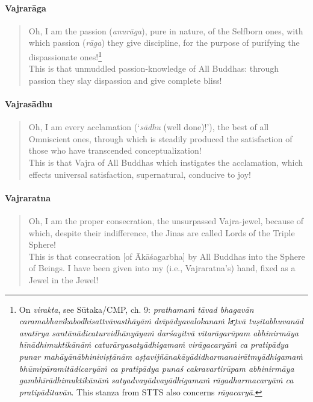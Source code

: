 \documentclass[11pt]{book}
\newcommand{\skt}[1]{\emph{#1}}
\begin{document}
\paragraph{Vajrarāga}

\begin{verse}
Oh, I am the passion (\emph{anurāga}), pure in nature, of the Selfborn ones, with which passion (\emph{rāga}) they give discipline, for the purpose of purifying the dispassionate ones!\footnote{On \skt{virakta}, see Sūtaka/CMP, ch. 9: \skt{prathamaṁ tāvad bhagavān caramabhavikabodhisattvāvasthāyāṁ dvīpādyavalokanaṁ kr̥tvā tuṣitabhuvanād avatīrya santānādicaturvidhānyāyaṁ darśayitvā vītarāgarūpam abhinirmāya hīnādhimuktikānāṁ caturāryasatyādhigamaṁ virāgacaryāṁ ca pratipādya punar mahāyānābhiniviṣṭānām aṣṭavijñānakāyādidharmanairātmyādhigamaṁ bhūmipāramitādicaryāṁ ca pratipādya punaś cakravartirūpam abhinirmāya gambhīrādhimuktikānāṁ satyadvayādvayādhigamaṁ rāgadharmacaryāṁ ca pratipāditavān}. This stanza from STTS also concerns \skt{rāgacaryā}.}\\
This is that unmuddled passion-knowledge of All Buddhas: through passion they slay dispassion and give complete bliss!\\
\end{verse}

\paragraph{Vajrasādhu}

\begin{verse}
Oh, I am every acclamation (`\emph{sādhu} (well done)!'), the best of all Omniscient ones, through which is steadily produced the satisfaction of those who have transcended conceptualization!\\
This is that Vajra of All Buddhas which instigates the acclamation, which effects universal satisfaction, supernatural, conducive to joy!
\end{verse}

\paragraph{Vajraratna}

\begin{verse}
Oh, I am the proper consecration, the unsurpassed Vajra-jewel, because of which, despite their indifference, the Jinas are called Lords of the Triple Sphere!\\
This is that consecration [of Ākāśagarbha] by All Buddhas into the Sphere of Beings. I have been given into my (i.e., Vajraratna's) hand, fixed as a Jewel in the Jewel! 
\end{verse}
\end{document}
